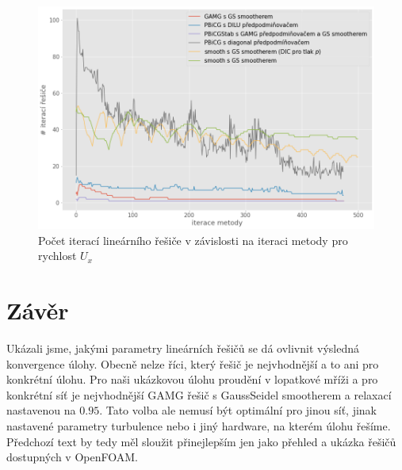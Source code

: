 \documentclass[a4paper,12pt]{report}
\theoremstyle{remark}
\begin{document}
\begin{figure}[H]
	\centering
	\includegraphics[width=1\linewidth]{ux-solver-iters.png}
	\caption{Počet iterací lineárního řešiče v závislosti na iteraci metody pro rychlost $U_x$}
	\label{fig:ux-iters}
\end{figure}



{\let\clearpage\relax \chapter{Závěr}}

Ukázali jsme, jakými parametry lineárních řešičů se dá ovlivnit výsledná konvergence úlohy. Obecně nelze říci, který řešič je nejvhodnější a to ani pro konkrétní úlohu. Pro naši ukázkovou úlohu proudění v lopatkové mříži a pro konkrétní síť je nejvhodnější GAMG řešič s GaussSeidel smootherem a relaxací nastavenou na $0.95$. Tato volba ale nemusí být optimální pro jinou síť, jinak nastavené parametry turbulence nebo i jiný hardware, na kterém úlohu řešíme. Předchozí text by tedy měl sloužit přinejlepším jen jako přehled a ukázka řešičů dostupných v OpenFOAM.



\newpage
\appendix
\end{document}
